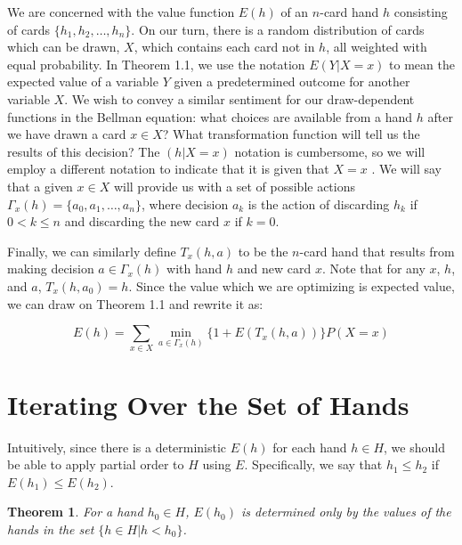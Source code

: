 \documentclass[paper=a4, fontsize=11pt,twoside]{report}   %
\newtheorem{theorem}{Theorem}
\begin{document}
We are concerned with the value function $E(h)$ of an $n$-card hand $h$ consisting of cards $\{h_1,h_2,\ldots,h_n\}$. On our turn, there is a random distribution of cards which can be drawn, $X$, which contains each card not in $h$, all weighted with equal probability. In Theorem 1.1, we use the notation $E(Y | X = x)$ to mean the expected value of a variable $Y$ given a predetermined outcome for another variable $X$. We wish to convey a similar sentiment for our draw-dependent functions in the Bellman equation: what choices are available from a hand $h$ after we have drawn a card $x \in X$? What transformation function will tell us the results of this decision? The $(h | X=x )$ notation is cumbersome, so we will employ a different notation to indicate that it is given that $X=x$ . We will say that a given $x \in X$  will provide us with a set of possible actions $\Gamma_x (h) = \{a_0,a_1,\ldots,a_n\}$, where decision $a_k$ is the action of discarding $h_k$ if $0 < k \leq n$  and discarding the new card $x$ if $k=0$.

Finally, we can similarly define $T_x(h,a)$ to be the $n$-card hand that results from making decision $a \in \Gamma_x(h)$ with hand $h$ and new card $x$. Note that for any $x$, $h$, and $a$, $T_x(h,a_0)=h$. Since the value which we are optimizing is expected value, we can draw on Theorem 1.1 and rewrite it as: 

$$E(h) = \sum_{x \in X} \min_{a \in \Gamma_x (h)} \{1 + E(T_x(h,a))\} P(X = x)$$

\section{Iterating Over the Set of Hands}

Intuitively, since there is a deterministic $E(h)$ for each hand $h \in H$, we should be able to apply partial order to $H$ using $E$. Specifically, we say that $h_1 \leq h_2$ if $E(h_1) \leq E(h_2)$.

\begin{theorem}
For a hand $h_0 \in H$, $E(h_0)$ is determined only by the values of the hands in the set $\{h \in H | h < h_0\}$.
\end{theorem}
\end{document}
